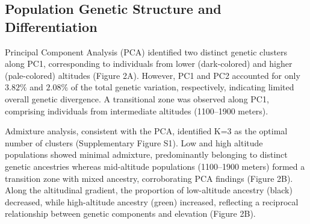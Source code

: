\documentclass[9pt,a4paper,twoside]{rho-class/rho}
\begin{document}
\begin{table}[!h]
    \small
    \captionsetup[table]{labelsep=space, 
        justification=raggedright, singlelinecheck=off}
    \caption{Altitude, coordinates, color category and samples sizes of \textit{I. rizeensis} used in this study.}
    \label{tab:my-table}
\end{table}

    \subsection{Population Genetic Structure and Differentiation}

        Principal Component Analysis (PCA) identified two distinct genetic clusters along PC1, corresponding to individuals from lower (dark-colored) and higher (pale-colored) altitudes (Figure 2A). However, PC1 and PC2 accounted for only $3.82\%$ and $2.08\%$ of the total genetic variation, respectively, indicating limited overall genetic divergence. A transitional zone was observed along PC1, comprising individuals from intermediate altitudes (1100–1900 meters).
        
        Admixture analysis, consistent with the PCA, identified K=3 as the optimal number of clusters (Supplementary Figure S1). Low and high altitude populations showed minimal admixture, predominantly belonging to distinct genetic ancestries whereas mid-altitude populations (1100–1900 meters) formed a transition zone with mixed ancestry, corroborating PCA findings (Figure 2B). Along the altitudinal gradient, the proportion of low-altitude ancestry (black) decreased, while high-altitude ancestry (green) increased, reflecting a reciprocal relationship between genetic components and elevation (Figure 2B).
\end{document}
